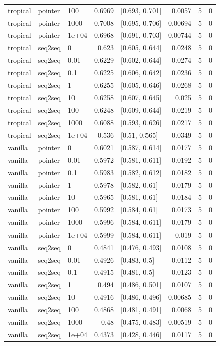 \documentclass[10pt]{article}
\begin{document}
{\begin{longtable}{lllrlrrr}
tropical & pointer & 100 & 0.6969 & [0.693, 0.701] & 0.0057 & 5 & 0\\
tropical & pointer & 1000 & 0.7008 & [0.695, 0.706] & 0.00694 & 5 & 0\\
tropical & pointer & 1e+04 & 0.6968 & [0.691, 0.703] & 0.00744 & 5 & 0\\
tropical & seq2seq & 0 & 0.623 & [0.605, 0.644] & 0.0248 & 5 & 0\\
tropical & seq2seq & 0.01 & 0.6229 & [0.602, 0.644] & 0.0274 & 5 & 0\\
tropical & seq2seq & 0.1 & 0.6225 & [0.606, 0.642] & 0.0236 & 5 & 0\\
tropical & seq2seq & 1 & 0.6255 & [0.605, 0.646] & 0.0268 & 5 & 0\\
tropical & seq2seq & 10 & 0.6258 & [0.607, 0.645] & 0.025 & 5 & 0\\
tropical & seq2seq & 100 & 0.6248 & [0.609, 0.644] & 0.0219 & 5 & 0\\
tropical & seq2seq & 1000 & 0.6088 & [0.593, 0.626] & 0.0217 & 5 & 0\\
tropical & seq2seq & 1e+04 & 0.536 & [0.51, 0.565] & 0.0349 & 5 & 0\\
vanilla & pointer & 0 & 0.6021 & [0.587, 0.614] & 0.0177 & 5 & 0\\
vanilla & pointer & 0.01 & 0.5972 & [0.581, 0.611] & 0.0192 & 5 & 0\\
vanilla & pointer & 0.1 & 0.5983 & [0.582, 0.612] & 0.0182 & 5 & 0\\
vanilla & pointer & 1 & 0.5978 & [0.582, 0.61] & 0.0179 & 5 & 0\\
vanilla & pointer & 10 & 0.5965 & [0.581, 0.61] & 0.0184 & 5 & 0\\
vanilla & pointer & 100 & 0.5992 & [0.584, 0.61] & 0.0173 & 5 & 0\\
vanilla & pointer & 1000 & 0.5996 & [0.584, 0.611] & 0.0179 & 5 & 0\\
vanilla & pointer & 1e+04 & 0.5999 & [0.584, 0.611] & 0.019 & 5 & 0\\
vanilla & seq2seq & 0 & 0.4841 & [0.476, 0.493] & 0.0108 & 5 & 0\\
vanilla & seq2seq & 0.01 & 0.4926 & [0.483, 0.5] & 0.0112 & 5 & 0\\
vanilla & seq2seq & 0.1 & 0.4915 & [0.481, 0.5] & 0.0123 & 5 & 0\\
vanilla & seq2seq & 1 & 0.494 & [0.486, 0.501] & 0.0107 & 5 & 0\\
vanilla & seq2seq & 10 & 0.4916 & [0.486, 0.496] & 0.00685 & 5 & 0\\
vanilla & seq2seq & 100 & 0.4868 & [0.481, 0.491] & 0.0068 & 5 & 0\\
vanilla & seq2seq & 1000 & 0.48 & [0.475, 0.483] & 0.00519 & 5 & 0\\
vanilla & seq2seq & 1e+04 & 0.4373 & [0.428, 0.446] & 0.0117 & 5 & 0\\
\bottomrule
\end{longtable}
}
\end{document}
